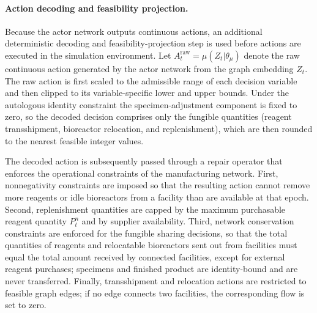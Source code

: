 \documentclass[preprint,review,12pt,nonatbib]{elsarticle}
\providecommand{\DIFadd}[1]{{\protect\color{blue}#1}} %
\providecommand{\DIFdel}[1]{} %
\providecommand{\DIFaddbegin}{} %
\providecommand{\DIFaddend}{} %
\providecommand{\DIFdelbegin}{} %
\providecommand{\DIFdelend}{} %
\providecommand{\DIFscaledelfig}{0.5}
\newlength{\DIFdelgraphicswidth} %
\newlength{\DIFdelgraphicsheight} %
\providecommand{\DIFaddincludegraphics}[2][]{{\color{blue}\fbox{\DIFOincludegraphics[#1]{#2}}}} %
\providecommand{\DIFdelincludegraphics}[2][]{%
\sbox{\DIFdelgraphicsbox}{\DIFOincludegraphics[#1]{#2}}%
\settoboxwidth{\DIFdelgraphicswidth}{\DIFdelgraphicsbox} %
\settoboxtotalheight{\DIFdelgraphicsheight}{\DIFdelgraphicsbox} %
\scalebox{\DIFscaledelfig}{%
\parbox[b]{\DIFdelgraphicswidth}{\usebox{\DIFdelgraphicsbox}\\[-\baselineskip] \rule{\DIFdelgraphicswidth}{0em}}\llap{\resizebox{\DIFdelgraphicswidth}{\DIFdelgraphicsheight}{%
\setlength{\unitlength}{\DIFdelgraphicswidth}%
\begin{picture}(1,1)%
\thicklines\linethickness{2pt} %
{\color[rgb]{1,0,0}\put(0,0){\framebox(1,1){}}}%
{\color[rgb]{1,0,0}\put(0,0){\line( 1,1){1}}}%
{\color[rgb]{1,0,0}\put(0,1){\line(1,-1){1}}}%
\end{picture}%
}\hspace*{3pt}}} %
} %
\DeclareRobustCommand{\DIFaddbegin}{\DIFOaddbegin \let\includegraphics\DIFaddincludegraphics} %
\DeclareRobustCommand{\DIFaddend}{\DIFOaddend \let\includegraphics\DIFOincludegraphics} %
\DeclareRobustCommand{\DIFdelbegin}{\DIFOdelbegin \let\includegraphics\DIFdelincludegraphics} %
\DeclareRobustCommand{\DIFdelend}{\DIFOaddend \let\includegraphics\DIFOincludegraphics} %
\begin{document}
\paragraph{Action decoding and feasibility projection.}
Because the actor network outputs continuous actions, an additional deterministic decoding and feasibility-projection step is used before actions are executed in the simulation environment. Let $A_t^{\mathrm{raw}}=\mu(Z_t|\theta_\mu)$ denote the raw continuous action generated by the actor network from the graph embedding $Z_t$. The raw action is first scaled to the admissible range of each decision variable and then clipped to its variable-specific lower and upper bounds. \DIFdelbegin \DIFdel{Integer-valued operational quantities, including specimen reassignment, }\DIFdelend \DIFaddbegin \DIFadd{Under the autologous identity constraint the specimen-adjustment component is fixed to zero, so the decoded decision comprises only the fungible quantities (}\DIFaddend reagent transshipment, bioreactor relocation, and replenishment\DIFdelbegin \DIFdel{quantities, }\DIFdelend \DIFaddbegin \DIFadd{), which }\DIFaddend are then rounded to the nearest feasible integer values.

The decoded action is subsequently passed through a repair operator that enforces the operational constraints of the manufacturing network. First, nonnegativity constraints are imposed so that the resulting action cannot remove more \DIFdelbegin \DIFdel{specimens, reagents , }\DIFdelend \DIFaddbegin \DIFadd{reagents }\DIFaddend or idle bioreactors from a facility than are available at that epoch. Second, replenishment quantities are capped by the maximum purchasable reagent quantity $P_t^n$ and by supplier availability. Third, network conservation constraints are enforced for \DIFdelbegin \DIFdel{internal sharing decisions: the total number of specimens, reagents , }\DIFdelend \DIFaddbegin \DIFadd{the fungible sharing decisions, so that the total quantities of reagents }\DIFaddend and relocatable bioreactors sent out from facilities must equal the total amount received by connected facilities, except for external reagent purchases\DIFaddbegin \DIFadd{; specimens and finished product are identity-bound and are never transferred}\DIFaddend . Finally, transshipment and relocation actions are restricted to feasible graph edges; if no edge connects two facilities, the corresponding flow is set to zero.
\end{document}
